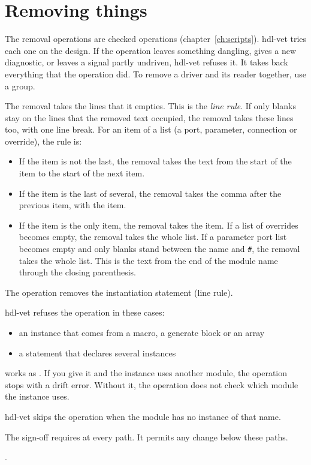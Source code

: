 \section{Removing things}

The removal operations are checked operations (chapter~\ref{ch:scripts}). hdl-vet tries
each one on the design. If the operation leaves something dangling, gives a new
diagnostic, or leaves a signal partly undriven, hdl-vet refuses it. It takes back
everything that the operation did. To remove a driver and its reader together, use a group.

The removal takes the lines that it empties. This is the \emph{line rule}. If only
blanks stay on the lines that the removed text occupied, the removal takes these lines
too, with one line break. For an item of a list (a port, parameter, connection or
override), the rule is:

\begin{itemize}
\item If the item is not the last, the removal takes the text from the start of the item
  to the start of the next item.
\item If the item is the last of several, the removal takes the comma after the previous
  item, with the item.
\item If the item is the only item, the removal takes the item. If a list of overrides
  becomes empty, the removal takes the whole list. If a parameter port list becomes empty
  and only blanks stand between the name and \texttt{\#}, the removal takes the whole
  list. This is the text from the end of the module name through the closing parenthesis.
\end{itemize}

\begin{entry}{}
\item[Writes] The operation removes the instantiation statement (line rule).
\item[Refused] hdl-vet refuses the operation in these cases:
  \begin{itemize}
  \item an instance that comes from a macro, a generate block or an array
  \item a statement that declares several instances
  \end{itemize}
\item[was]  works as . If you give it and the instance uses
  another module, the operation stops with a drift error. Without it, the operation does
  not check which module the instance uses.
\item[Again] hdl-vet skips the operation when the module has no instance of that name.
\item[Sign-off] The sign-off requires  at every path. It permits
  any change below these paths.
\item[Example] .
\end{entry}

